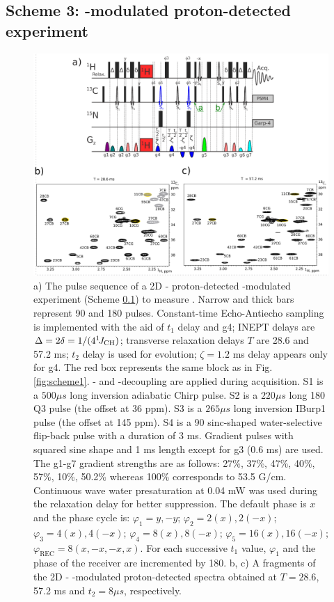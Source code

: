 \documentclass[twocolumn]{svjour3}           %
\begin{document}
\subsection{Scheme 3: \oneJch-modulated proton-detected experiment}
\label{subseq:scheme3}

\begin{figure}
  \includegraphics[width=1.0\textwidth]{Fig3_maxZQ.pdf}
  \caption{
    a) The pulse sequence of a 2D \hlab-\clab{} proton-detected 
    \oneJch-modulated experiment (Scheme \ref{subseq:scheme3}) 
    to measure \gtwoCH. Narrow and thick bars represent 90\degree{} 
    and 180\degree{} pulses. Constant-time \clab{} Echo-Antiecho 
    sampling is implemented with the aid of $t_1$ delay and g4; 
    INEPT delays are $\Delta = 2\delta = 1/(4 ^1\!J_\text{CH})$; 
    transverse relaxation delays $T$ are 28.6 and 57.2 ms; 
    $t_2$ delay is used for \oneJch{} evolution; $\zeta = 1.2$ ms 
    delay appears only for g4. The red box represents the same block 
    as in Fig. \ref{fig:scheme1}. \nlab- and \clab-decoupling are applied 
    during acquisition. 
    S1 is a $500 \mu s$ long \clab{} inversion adiabatic Chirp pulse. 
    S2 is a $220 \mu s$ long 180\degree{} Q3 pulse (the offset at 36 ppm). 
    S3 is a $265 \mu s$ long inversion IBurp1 pulse (the offset at 145 ppm).
    S4 is a 90\degree{} sinc-shaped water-selective \hlab{} flip-back pulse with a duration of 3 ms.
    Gradient pulses with squared sine shape and 1 ms length except for g3 
    (0.6 ms) are used. The g1-g7 gradient strengths are as follows: 
    27\%, 37\%, 47\%, 40\%, 57\%, 10\%, 50.2\% whereas 100\% corresponds to 53.5 G/cm. Continuous wave water presaturation at 0.04 mW was used during the relaxation delay for better suppression.
    The default phase is $x$ and the phase cycle is: 
    $\varphi_1 = y, -y$; 
    $\varphi_2 = 2(x), 2(-x)$; 
    $\varphi_3 = 4(x), 4(-x)$; 
    $\varphi_4 = 8(x), 8(-x)$; 
    $\varphi_5 = 16(x), 16(-x)$; 
    $\varphi_\text{REC} = 8(x, -x, -x, x)$. 
    For each successive $t_1$ value, $\varphi_1$ and the phase of the receiver 
    are incremented by 180\degree. 
    b, c) A fragments of the 2D \hlab-\clab{} \oneJch-modulated proton-detected spectra obtained at $T = 28.6$, 57.2 ms and $t_2 = 8 \mu s$, 
    respectively.
  }
  \label{fig:scheme3}
\end{figure}
\end{document}

